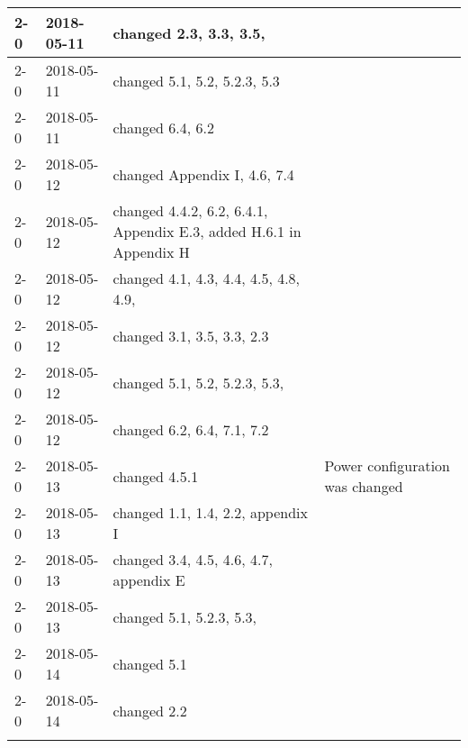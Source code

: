 \begin{longtable}{|p{}| p{} |p{} |p{}|}
    2-0     &   2018-05-11   & changed 2.3, 3.3, 3.5,  &  \\\hline
    2-0     &   2018-05-11   & changed 5.1, 5.2, 5.2.3, 5.3 &  \\\hline
    2-0     &   2018-05-11   & changed 6.4, 6.2 &  \\\hline
    2-0     &   2018-05-12   & changed Appendix I, 4.6, 7.4 & \\ \hline
    2-0     &   2018-05-12   & changed 4.4.2, 6.2, 6.4.1, Appendix E.3, added H.6.1 in Appendix H & \\ \hline
    2-0     &   2018-05-12   & changed 4.1, 4.3, 4.4, 4.5, 4.8, 4.9,  & \\ \hline
    2-0     &   2018-05-12   & changed 3.1, 3.5, 3.3, 2.3 & \\ \hline
    2-0     &   2018-05-12   & changed 5.1, 5.2, 5.2.3, 5.3,  & \\ \hline
    2-0     &   2018-05-12   & changed 6.2, 6.4, 7.1, 7.2 & \\ \hline
    2-0     &   2018-05-13   & changed 4.5.1 & Power configuration was changed \\ \hline
    2-0     &   2018-05-13   & changed 1.1, 1.4, 2.2, appendix I \\ \hline
    2-0     &   2018-05-13   & changed 3.4, 4.5, 4.6, 4.7, appendix E \\ \hline
    2-0     &   2018-05-13   & changed 5.1, 5.2.3, 5.3,  \\ \hline
    2-0     &   2018-05-14   & changed 5.1 \\ \hline
    2-0     &   2018-05-14   & changed 2.2 \\ \hline
    
    \label{COR}
\end{longtable}